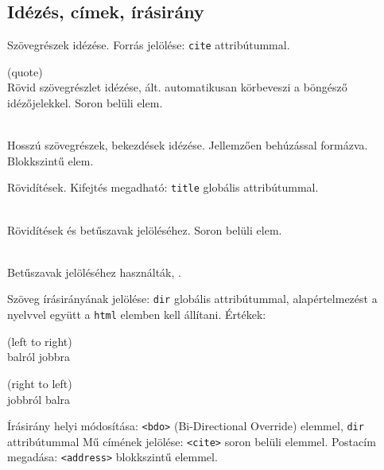 \subsection{Idézés, címek, írásirány}

\begin{frame}
  Szövegrészek idézése. Forrás jelölése: \texttt{cite} attribútummal.
  \begin{description}[m]
    \item[\texttt{<q>}] (quote) \hfill \\ Rövid szövegrészlet idézése, ált. automatikusan körbeveszi a böngésző idézőjelekkel. Soron belüli elem.
    \item[\texttt{<blockquote>}] \hfill \\ Hosszú szövegrészek, bekezdések idézése. Jellemzően behúzással formázva. Blokkszintű elem.
  \end{description}
  \vfill
  Rövidítések. Kifejtés megadható: \texttt{title} globális attribútummal.
  \begin{description}[m]
    \item[\texttt{<abbr>}] \hfill \\ Rövidítések és betűszavak jelöléséhez. Soron belüli elem.
    \item[\texttt{<acronym>}] \hfill \\ Betűszavak jelöléséhez használták, .
  \end{description}
\end{frame}

\begin{frame}
  Szöveg írásirányának jelölése: \texttt{dir} globális attribútummal, alapértelmezést a nyelvvel együtt a \texttt{html} elemben kell állítani. Értékek:
  \begin{description}[m]
    \item[\texttt{ltr}] (left to right) \hfill \\ balról jobbra
    \item[\texttt{rtl}] (right to left) \hfill \\ jobbról balra
  \end{description}
  \vfill
  Írásirány helyi módosítása: \texttt{<bdo>} (Bi-Directional Override) elemmel, \texttt{dir} attribútummal
  \vfill
  Mű címének jelölése: \texttt{<cite>} soron belüli elemmel.
  \vfill
  Postacím megadása: \texttt{<address>} blokkszintű elemmel.
\end{frame}


